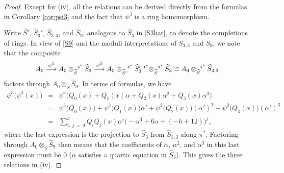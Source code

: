 \documentclass{gtpart}
\theoremstyle{definition}
\theoremstyle{remark}
\newcommand{\HS}{\widehat{S}}
\newcommand{\A}{\alpha}
\newcommand{\p}{\psi^3}
\newcommand{\s}{S_{3,3}}
\begin{document}
\begin{proof}
 Except for (iv), all the relations can be derived directly from the formulas in Corollary \ref{cor:psi3} and the fact that $\p$ is a ring homomorphism.  

 Write $\HS'$, $\HS_3'$, $\HS_{3,3}$, and $\HS_9$, analogous to $\HS_3$ in \eqref{S3hat}, to denote the completions of rings.  
 In view of \eqref{S9} and the moduli interpretations of $\s$ and $S_9$, we note that the composite 
 \[
  A_0 \stackrel{\p}{\longrightarrow} A_0 \tensor[]{\otimes}{_{\HS}^{s^*}} \HS_3 
  \stackrel{\p}{\longrightarrow} A_0 \tensor[]{\otimes}{_{\HS'}^{s^*}} \HS_3' \tensor[^{t^*}]{\otimes}{_{\HS}^{s^*}} \HS_3 
  \cong A_0 \tensor[]{\otimes}{_{\HS}^{s^*}} \HS_{3,3} 
 \]
 factors through $A_0 \otimes_{\HS} \HS_9$.  In terms of formulas, we have 
 \begin{eqnarray*}
  \p \big( \p(x) \big) & = & \p \big( Q_0(x) + Q_1(x) \A + Q_2(x) \A^2 + Q_3(x) \A^3 \big) \\
                       & = & \p \big( Q_0(x) \big) + \p \big( Q_1(x) \big) \A' + \p \big( Q_2(x) \big) (\A')^2 + \p \big( Q_3(x) \big) (\A')^3 \\
                       & = & \sum_{i,~j~=~0}^3 Q_iQ_j(x) \A^i \big( -\A^3 + 6 \A + (-h + 12) \big)^j, 
 \end{eqnarray*}
 where the last expression is the projection to $\HS_3$ from $\HS_{3,3}$ along $\pi^*$.  
 Factoring through $A_0 \otimes_{\HS} \HS_9$ then means that the coefficients of $\A$, $\A^2$, and $\A^3$ in this last expression must be 0 
 ($\A$ satisfies a quartic equation in $\HS_3$).  This gives the three relations in (iv).
\end{proof}
\end{document}
